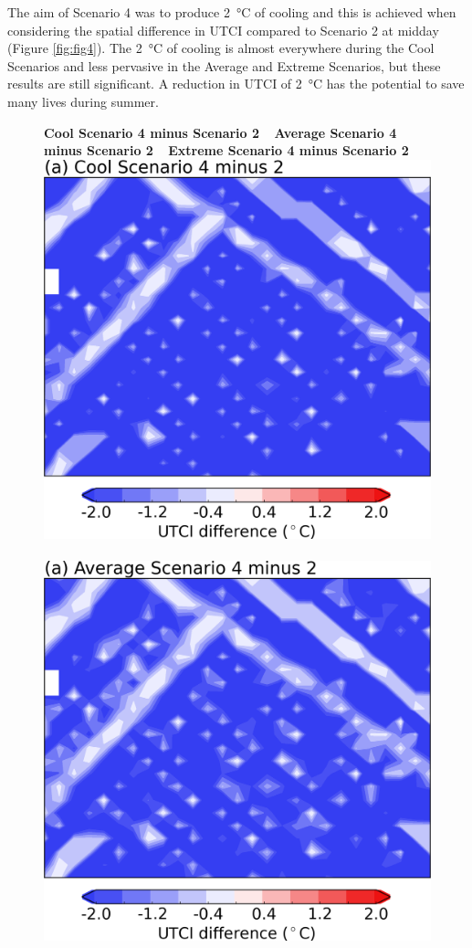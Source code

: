\documentclass[final,3p,times,authoryear]{elsarticle}
\begin{document}
The aim of Scenario 4 was to produce 2\SI{}{\degreeCelsius} of cooling and this is achieved when considering the spatial difference in UTCI compared to Scenario 2 at midday (Figure \ref{fig:fig4}). The 2\SI{}{\degreeCelsius} of cooling is almost everywhere during the Cool Scenarios and less pervasive in the Average and Extreme Scenarios, but these results are still significant. A reduction in UTCI of 2\SI{}{\degreeCelsius} has the potential to save many lives during summer.


\begin{figure}[!htbp]
\centering  
\textbf{Cool Scenario 4 minus Scenario 2} ~
\textbf{Average Scenario 4 minus Scenario 2} ~
\textbf{Extreme Scenario 4 minus Scenario 2} 
\includegraphics[scale=0.30]{images/fig4a}
~
\includegraphics[scale=0.30]{images/fig4b} 

\end{figure}
\end{document}
